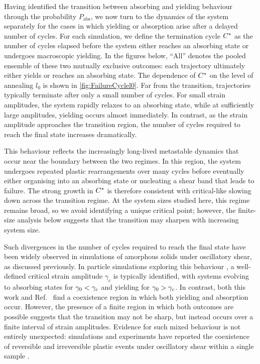 Having identified the transition between absorbing and yielding behaviour through the probability $P_{\mathrm{abs}}$, we now turn to the dynamics of the system separately for the cases in which yielding or absorption arise after a delayed number of cycles. For each simulation, we define the termination cycle $C^\ast$ as the number of cycles elapsed before the system either reaches an absorbing state or undergoes macroscopic yielding. In the figures below, ``All'' denotes the pooled ensemble of these two mutually exclusive outcomes: each trajectory ultimately either yields or reaches an absorbing state. The dependence of $C^\ast$ on the level of annealing $l_0$ is shown in \cref{fig:FailureCyclel0}. Far from the transition, trajectories typically terminate after only a small number of cycles. For small strain amplitudes, the system rapidly relaxes to an absorbing state, while at sufficiently large amplitudes, yielding occurs almost immediately. In contrast, as the strain amplitude approaches the transition region, the number of cycles required to reach the final state increases dramatically.

This behaviour reflects the increasingly long-lived metastable dynamics that occur near the boundary between the two regimes. In this region, the system undergoes repeated plastic rearrangements over many cycles before eventually either organising into an absorbing state or nucleating a shear band that leads to failure. The strong growth in $C^\ast$ is therefore consistent with critical-like slowing down across the transition regime. At the system sizes studied here, this regime remains broad, so we avoid identifying a unique critical point; however, the finite-size analysis below suggests that the transition may sharpen with increasing system size.

Such divergences in the number of cycles required to reach the final state have been widely observed in simulations of amorphous solids under oscillatory shear, as discussed previously. In particle simulations exploring this behaviour \cite{Fiocco2013,Regev_onset_2013,Leishangthem2017,kawasakiMacroscopicYieldingJammed2016}, a well-defined critical strain amplitude $\gamma_c$ is typically identified, with systems evolving to absorbing states for $\gamma_0 < \gamma_c$ and yielding for $\gamma_0 > \gamma_c$. In contrast, both this work and Ref.~\cite{khandareElastoplasticModellingCyclic2026} find a coexistence region in which both yielding and absorption occur. However, the presence of a finite region in which both outcomes are possible suggests that the transition may not be sharp, but instead occurs over a finite interval of strain amplitudes. Evidence for such mixed behaviour is not entirely unexpected: simulations and experiments have reported the coexistence of reversible and irreversible plastic events under oscillatory shear within a single sample \cite{LundbergReversiblePlasticEvents2008,KhirallahIntegerModel2021}.

